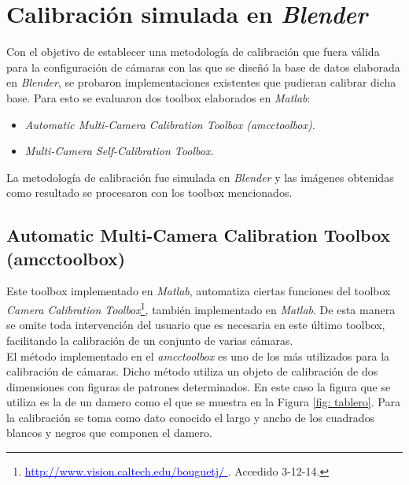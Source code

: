 \section{Calibración simulada en \emph{Blender}}
 
 Con el objetivo de establecer una metodología de calibración que fuera válida para la configuración de cámaras con las que se diseñó la base de datos elaborada en \emph{Blender}, se probaron implementaciones existentes que pudieran calibrar dicha base. Para esto se evaluaron dos toolbox elaborados en \emph{Matlab}: 
 \begin{itemize}
 \item  \emph{Automatic Multi-Camera Calibration Toolbox (amcctoolbox).}
 \item  \emph{Multi-Camera Self-Calibration Toolbox.}
 \end{itemize} 
 
La metodología de calibración fue simulada en \emph{Blender} y las imágenes obtenidas como resultado se procesaron con los toolbox mencionados.
 

 
\subsection{Automatic Multi-Camera Calibration Toolbox (amcctoolbox)  \cite{amcctoolbox} }


Este toolbox implementado en \emph{Matlab}, automatiza ciertas funciones del  toolbox \textit{Camera Calibration Toolbox}\footnote{\textcolor{blue}{\underline{http://www.vision.caltech.edu/bouguetj/   }}. Accedido 3-12-14.}, también implementado en \emph{Matlab}. De esta manera se omite toda intervención del usuario que es necesaria en este último toolbox, facilitando la calibración de un conjunto de varias cámaras.\\

El método implementado en el \textit{amcctoolbox} es uno de los más utilizados para la calibración de cámaras. Dicho método utiliza un objeto de calibración de dos dimensiones con figuras de patrones determinados. En este caso la figura que se utiliza es la de un damero como el que se muestra en la Figura \ref{fig: tablero}. Para la calibración se toma como dato conocido el largo y ancho de los cuadrados blancos y negros que componen el damero.

